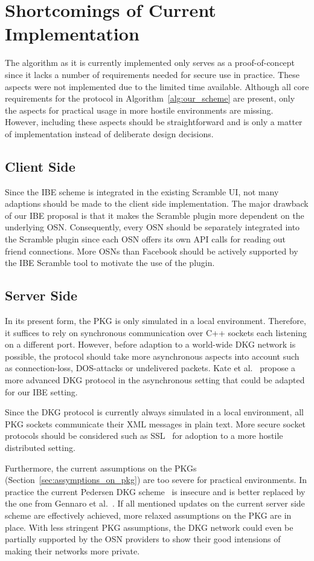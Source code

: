 \section{Shortcomings of Current Implementation}
The algorithm as it is currently implemented only serves as a proof-of-concept since it lacks a number of requirements needed for secure use in practice. These aspects were not implemented due to the limited time available. Although all core requirements for the protocol in Algorithm~\ref{alg:our_scheme} are present, only the aspects for practical usage in more hostile environments are missing. However, including these aspects should be straightforward and is only a matter of implementation instead of deliberate design decisions.

\subsection{Client Side}
Since the IBE scheme is integrated in the existing Scramble UI, not many adaptions should be made to the client side implementation. The major drawback of our IBE proposal is that it makes the Scramble plugin more dependent on the underlying OSN. Consequently, every OSN should be separately integrated into the Scramble plugin since each OSN offers its own API calls for reading out friend connections. More OSNs than Facebook should be actively supported by the IBE Scramble tool to motivate the use of the plugin.

\subsection{Server Side}
In its present form, the PKG is only simulated in a local environment. Therefore, it suffices to rely on synchronous communication over C++ sockets each listening on a different port. However, before adaption to a world-wide DKG network is possible, the protocol should take more asynchronous aspects into account such as connection-loss, DOS-attacks or undelivered packets. Kate et al.~\cite{art:KateHG12} propose a more advanced DKG protocol in the asynchronous setting that could be adapted for our IBE setting.

Since the DKG protocol is currently always simulated in a local environment, all PKG sockets communicate their XML messages in plain text. More secure socket protocols should be considered such as SSL~\cite{rfc6101} for adoption to a more hostile distributed setting.

Furthermore, the current assumptions on the PKGs (Section~\ref{sec:assymptions_on_pkg}) are too severe for practical environments. In practice the current Pedersen DKG scheme~\cite{art:Pedersen91a} is insecure and is better replaced by the one from Gennaro et al.~\cite{art:GennaroJKR07}. If all mentioned updates on the current server side scheme are effectively achieved, more relaxed assumptions on the PKG are in place. With less stringent PKG assumptions, the DKG network could even be partially supported by the OSN providers to show their good intensions of making their networks more private.

